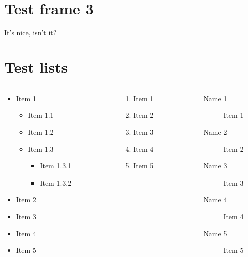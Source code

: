 \documentclass[%
    listings={
        Lean=listings-lean,
        Go
    },
	withappendix,
]{custom}
\begin{document}
\section{Test frame 3}
\begin{sframe}
	It's nice, isn't it?
\end{sframe}

\section{Test lists}
\begin{sframe}
	\begin{columns}
		\begin{column}{.32\linewidth}
			\begin{itemize}
				\item Item 1
				      \begin{itemize}
					      \item Item 1.1
					      \item Item 1.2
					      \item Item 1.3
					            \begin{itemize}
						            \item Item 1.3.1
						            \item Item 1.3.2
					            \end{itemize}
				      \end{itemize}
				\item Item 2
				\item Item 3
				\item Item 4
				\item Item 5
			\end{itemize}
		\end{column}
		\begin{column}{.05\linewidth}
			\centering
			\rule{.1mm}{.7\textheight}
		\end{column}
		\begin{column}{.24\linewidth}
			\begin{enumerate}
				\item Item 1
				\item Item 2
				\item Item 3
				\item Item 4
				\item Item 5
			\end{enumerate}
		\end{column}
		\begin{column}{.05\linewidth}
			\centering
			\rule{.1mm}{.7\textheight}
		\end{column}
		\begin{column}{.3\linewidth}
			\begin{description}
				\item[Name 1] Item 1
				\item[Name 2] Item 2
				\item[Name 3] Item 3
				\item[Name 4] Item 4
				\item[Name 5] Item 5
			\end{description}
		\end{column}
	\end{columns}
\end{sframe}
\end{document}
